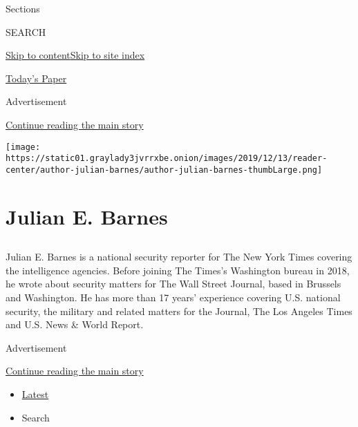 Sections

SEARCH

\protect\hyperlink{site-content}{Skip to
content}\protect\hyperlink{site-index}{Skip to site index}

\href{https://myaccount.nytimes3xbfgragh.onion/auth/login?response_type=cookie\&client_id=vi}{}

\href{https://www.nytimes3xbfgragh.onion/section/todayspaper}{Today's
Paper}

Advertisement

\protect\hyperlink{after-top}{Continue reading the main story}

\texttt{[image: https://static01.graylady3jvrrxbe.onion/images/2019/12/13/reader-center/author-julian-barnes/author-julian-barnes-thumbLarge.png]}

\hypertarget{julian-e-barnes}{%
\section{Julian E. Barnes}\label{julian-e-barnes}}

\subsection{}

Julian E. Barnes is a national security reporter for The New York Times
covering the intelligence agencies. Before joining The Times's
Washington bureau in 2018, he wrote about security matters for The Wall
Street Journal, based in Brussels and Washington. He has more than 17
years' experience covering U.S. national security, the military and
related matters for the Journal, The Los Angeles Times and U.S. News \&
World Report.

Advertisement

\protect\hyperlink{after-mid1}{Continue reading the main story}

\begin{itemize}
\tightlist
\item
  \protect\hyperlink{stream-panel}{Latest}
\item
  Search
\end{itemize}


